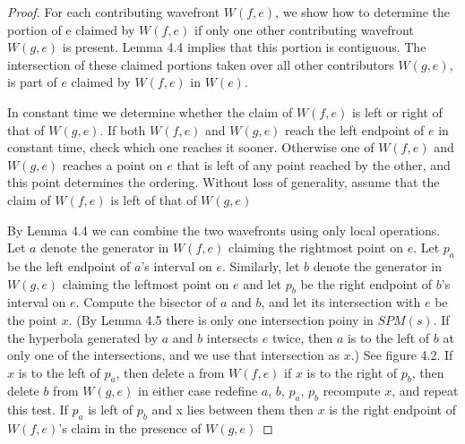 \begin{proof}
	For each contributing wavefront $W(f,e)$, we show how to determine the
	portion of e claimed by $W(f,e)$ if only one other contributing wavefront
	$W(g,e)$ is present. Lemma 4.4 implies that this portion is contiguous. The
	intersection of these  claimed portions taken over all other contributors
	$W(g,e)$, is part of $e$ claimed by $W(f,e)$ in $W(e)$.

	In constant time we determine whether the claim of $W(f,e)$ is left or right
	of that of $W(g,e)$. If both $W(f,e)$ and $W(g,e)$ reach the left endpoint
	of $e$ in constant time, check which one reaches it sooner. Otherwise one of
	$W(f,e)$ and $W(g,e)$ reaches a point on $e$ that is left of any point
	reached by the other, and this point determines the ordering. Without loss
	of generality, assume that the claim of $W(f,e)$ is left of that of $W(g,e)$

	By Lemma 4.4 we can combine the two wavefronts using only local operations.
	Let $a$ denote the generator in $W(f,e)$ claiming the rightmost point on
	$e$. Let $p_a$ be the left endpoint of $a$'s interval on $e$. Similarly, let
	$b$ denote the generator in $W(g,e)$ claiming the leftmost point on $e$ and
	let $p_b$ be the right endpoint of $b$'s interval on $e$. Compute the
	bisector of $a$ and $b$, and let its intersection with $e$ be the point $x$.
	(By Lemma 4.5 there is only one intersection poiny in $SPM(s)$. If the
	hyperbola generated by $a$ and $b$ intersects $e$ twice, then $a$ is to the
	left of $b$ at only one of the intersections, and we use that intersection
	as $x$.) See figure 4.2. If $x$ is to the left of $p_a$, then delete a from
	$W(f,e)$ if $x$ is to the right of $p_b$, then delete $b$ from $W(g,e)$ in
	either case redefine $a$, $b$, $p_a$, $p_b$ recompute $x$, and repeat this
	test. If $p_a$ is left of $p_b$ and x lies between them then $x$ is the
	right endpoint of $W(f,e)$'s claim in the presence of $W(g,e)$
	

\end{proof}
